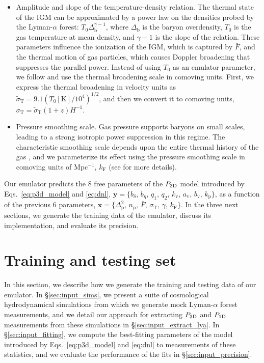 \documentclass{aa}
\newcommand{\lyaf}{Lyman-$\alpha$ forest\xspace}
\newcommand{\poned}{\ensuremath{P_{\rm 1D}}\xspace}
\newcommand{\pthreed}{\ensuremath{P_{\rm 3D}}\xspace}
\newcommand{\mflux}{\ensuremath{\bar{F}}\xspace}
\begin{document}
\begin{itemize}
    \item Amplitude and slope of the temperature-density relation. The thermal state of the IGM can be approximated by a power law on the densities probed by the \lyaf \citep{hydro_Lukic2015}: $T_0\Delta_\mathrm{b}^{\gamma-1}$, where $\Delta_\mathrm{b}$ is the baryon overdensity, $T_0$ is the gas temperature at mean density, and $\gamma-1$ is the slope of the relation. These parameters influence the ionization of the IGM, which is captured by \mflux, and the thermal motion of gas particles, which causes Doppler broadening that suppresses the parallel power. Instead of using $T_0$ as an emulator parameter, we follow \citet{Pedersen2021} and use the thermal broadening scale in comoving units. First, we express the thermal broadening in velocity units as $\tilde{\sigma}_\mathrm{T} = 9.1 (T_0[\mathrm{K}]/10^4)^{1/2}$, and then we convert it to comoving units, $\sigma_\mathrm{T}=\tilde{\sigma}_\mathrm{T}(1+z) H^{-1}$.

    \item Pressure smoothing scale. Gas pressure supports baryons on small scales, leading to a strong isotropic power suppression in this regime. The characteristic smoothing scale depends upon the entire thermal history of the gas \citep{gnedin1998ProbingUniverseLyalpha}, and we parameterize its effect using the pressure smoothing scale in comoving units of Mpc$^{-1}$, $k_\mathrm{F}$ (see \citet{Pedersen2021} for more details).
\end{itemize}

Our emulator predicts the 8 free parameters of the \pthreed model introduced by Eqs.~\ref{eq:p3d_model} and \ref{eq:dnl}, $\mathbf{y}=\{b_\delta,\, b_\eta,\, q_1,\, q_2,\, k_\mathrm{v},\, a_\mathrm{v},\, b_\mathrm{v}, \, k_\mathrm{p}\}$, as a function of the previous 6 parameters, $\mathbf{x}=\{\Delta_\mathrm{p}^2,\, n_\mathrm{p},\, \mflux,\, \sigma_\mathrm{T},\, \gamma,\, k_\mathrm{F}\}$. In the three next sections, we generate the training data of the emulator, discuss its implementation, and evaluate its precision.


\section{Training and testing set}
\label{sec:input}

In this section, we describe how we generate the training and testing data of our emulator. In \S\ref{sec:input_sims}, we present a suite of cosmological hydrodynamical simulations from which we generate mock \lyaf measurements, and we detail our approach for extracting \pthreed and \poned measurements from these simulations in \S\ref{sec:input_extract_lya}. In \S\ref{sec:input_fitting}, we compute the best-fitting parameters of the model introduced by Eqs.~\ref{eq:p3d_model} and \ref{eq:dnl} to measurements of these statistics, and we evaluate the performance of the fits in \S\ref{sec:input_precision}.
\end{document}
